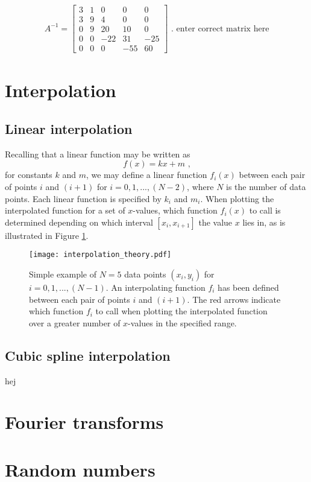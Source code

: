 \documentclass[paper=a4, fontsize=11pt]{scrartcl}
\begin{document}
\begin{align}
\label{A define}
A^{-1} = 
\begin{bmatrix}
3 & 1 & 0 & 0 & 0 \\
3 & 9 & 4 & 0 & 0 \\
0 & 9 & 20 & 10 & 0 \\
0 & 0 & -22 & 31 & -25 \\
0 & 0 & 0 & -55 & 60
\end{bmatrix} \text{ . enter correct matrix here}
\end{align}

\section{Interpolation}
\subsection{Linear interpolation}
Recalling that a linear function may be written as 
\begin{equation}
f(x) = kx + m \text{ ,}
\end{equation}
for constants $k$ and $m$, we may define a linear function $f_{i}(x)$ between each pair of points $i$ and $(i+1)$ for $i = 0, 1, ... , (N-2)$, where $N$ is the number of data points. Each linear function is specified by $k_{i}$ and $m_{i}$. When plotting the interpolated function for a set of $x$-values, which function $f_{i}(x)$ to call is determined depending on which interval $[x_{i}, x_{i+1}]$ the value $x$ lies in, as is illustrated in Figure \ref{interpolation theory}. 
\begin{figure}
	\centering
	\texttt{[image: interpolation\_theory.pdf]}
	\caption{\footnotesize{Simple example of $N=5$ data points $(x_{i}, y_{i})$ for $i = 0, 1, ... , (N-1)$. An interpolating function $f_{i}$ has been defined between each pair of points $i$ and $(i+1)$. The red arrows indicate which function $f_{i}$ to call when plotting the interpolated function over a greater number of $x$-values in the specified range.}}
	\label{interpolation theory}
\end{figure}

\subsection{Cubic spline interpolation}
hej
\section{Fourier transforms}


\section{Random numbers}
\end{document}
